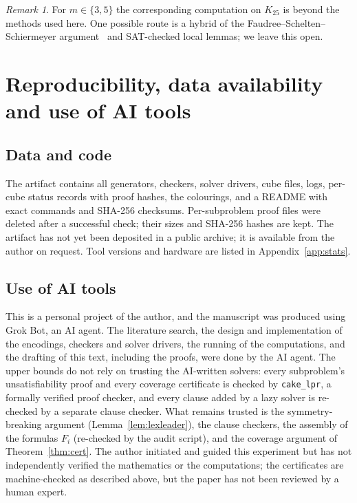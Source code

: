 \documentclass[11pt]{amsart}
\theoremstyle{definition}
\theoremstyle{remark}
\newtheorem{remark}[theorem]{Remark}
\begin{document}
\begin{remark}
For $m\in\{3,5\}$ the corresponding computation on $K_{25}$ is beyond the methods used here. One possible route is a hybrid of the
Faudree--Schelten--Schiermeyer argument~\cite{FSS3} and SAT-checked local lemmas; we leave this open.
\end{remark}

\section{Reproducibility, data availability and use of AI tools}\label{sec:repro}

\subsection*{Data and code}
The artifact contains all generators, checkers, solver drivers, cube files, logs, per-cube status records with proof hashes, the
colourings, and a README with exact commands and SHA-256 checksums. Per-subproblem proof files were deleted after a successful check;
their sizes and SHA-256 hashes are kept. The artifact has not yet been deposited in a public archive; it is available from the author on
request. Tool versions and hardware are listed in Appendix~\ref{app:stats}.

\subsection*{Use of AI tools}
This is a personal project of the author, and the manuscript was produced using Grok Bot, an AI agent. The literature search, the
design and implementation of the encodings, checkers and solver drivers, the running of the computations, and the drafting of this
text, including the proofs, were done by the AI agent. The upper bounds do not rely on trusting the AI-written solvers: every
subproblem's unsatisfiability proof and every coverage certificate is checked by \texttt{cake\_lpr}, a formally verified proof checker,
and every clause added by a lazy solver is re-checked by a separate clause checker. What remains trusted is the symmetry-breaking
argument (Lemma~\ref{lem:lexleader}), the clause checkers, the assembly of the formulas $F_i$ (re-checked by the audit script), and the
coverage argument of Theorem~\ref{thm:cert}. The author initiated and guided this experiment but has not independently verified the
mathematics or the computations; the certificates are machine-checked as described above, but the paper has not been reviewed by a
human expert.
\end{document}
